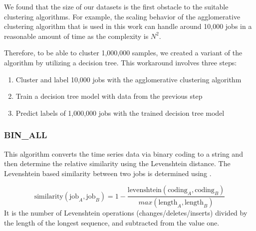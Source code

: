 \documentclass{jhps}
\begin{document}
We found that the size of our datasets is the first obstacle to the suitable clustering algorithms.
For example, the scaling behavior of the agglomerative clustering algorithm that is used in this work can handle around 10,000 jobs in a reasonable amount of time as the complexity is \(N^{2}\).

Therefore, to be able to cluster 1,000,000 samples, we created a variant of the algorithm by utilizing a decision tree.
This workaround involves three steps:

\begin{enumerate}
 \item Cluster and label 10,000 jobs with the agglomerative clustering algorithm
 \item Train a decision tree model with data from the previous step
 \item Predict labels of 1,000,000 jobs with the trained decision tree model
\end{enumerate}

\subsubsection{BIN\_ALL}
This algorithm converts the time series data via binary coding to a string and then determine the relative similarity using the Levenshtein distance.
The Levenshtein based similarity between two jobs is determined using .

\begin{equation}
	\text{similarity}\left(\text{job}_{A},\text{job}_{B} \right) = 1 - \frac{\text{levenshtein}\left(\text{coding}_{A},\text{coding}_{B} \right) }{max \left(\text{length}_{A},\text{length}_{B} \right) } \label{eq:sim:bin_all}
\end{equation}
It is the number of Levenshtein operations (changes/deletes/inserts) divided by the length of the longest sequence, and subtracted from the value one.

\end{document}
